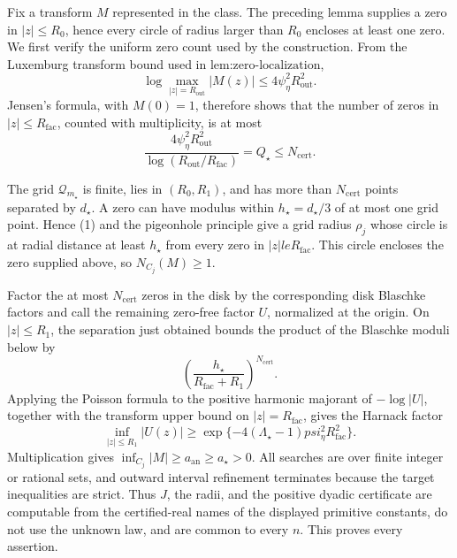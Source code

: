 Fix a transform \(M\) represented in the class.  The preceding lemma supplies a zero in \(|z|\le R_0\), hence every circle of radius larger than \(R_0\) encloses at least one zero.  We first verify the uniform zero count used by the construction.  From the Luxemburg transform bound used in \(\text{lem:zero-localization}\),
\[
 \log\max_{|z|=R_{\mathrm{out}}}|M(z)|
 \le4\psi_{\eta}^2R_{\mathrm{out}}^2.
\]
Jensen's formula, with \(M(0)=1\), therefore shows that the number of zeros in \(|z|\le R_{\mathrm{fac}}\), counted with multiplicity, is at most
\[
 \frac{4\psi_{\eta}^2R_{\mathrm{out}}^2}
 {\log(R_{\mathrm{out}}/R_{\mathrm{fac}})}
 =Q_{\star}\le N_{\mathrm{cert}}. \tag{1}
\]

The grid \(\mathcal Q_{m_{\star}}\) is finite, lies in \((R_0,R_1)\), and has more than \(N_{\mathrm{cert}}\) points separated by \(d_{\star}\).  A zero can have modulus within \(h_{\star}=d_{\star}/3\) of at most one grid point.  Hence (1) and the pigeonhole principle give a grid radius \(\rho_j\) whose circle is at radial distance at least \(h_{\star}\) from every zero in \(|z|le R_{\mathrm{fac}}\).  This circle encloses the zero supplied above, so \(N_{C_j}(M)\ge1\).

Factor the at most \(N_{\mathrm{cert}}\) zeros in the disk by the corresponding disk Blaschke factors and call the remaining zero-free factor \(U\), normalized at the origin.  On \(|z|\le R_1\), the separation just obtained bounds the product of the Blaschke moduli below by
\[
 \left(\frac{h_{\star}}{R_{\mathrm{fac}}+R_1}\right)^{N_{\mathrm{cert}}}.
\]
Applying the Poisson formula to the positive harmonic majorant of \(-\log|U|\), together with the transform upper bound on \(|z|=R_{\mathrm{fac}}\), gives the Harnack factor
\[
 \inf_{|z|\le R_1}|U(z)|
 \ge \exp\{-4(\Lambda_{\star}-1)psi_{\eta}^2R_{\mathrm{fac}}^2\}.
\]
Multiplication gives \(\inf_{C_j}|M|\ge a_{\mathrm{an}}\ge a_{\star}>0\).  All searches are over finite integer or rational sets, and outward interval refinement terminates because the target inequalities are strict.  Thus \(J\), the radii, and the positive dyadic certificate are computable from the certified-real names of the displayed primitive constants, do not use the unknown law, and are common to every \(n\).  This proves every assertion.